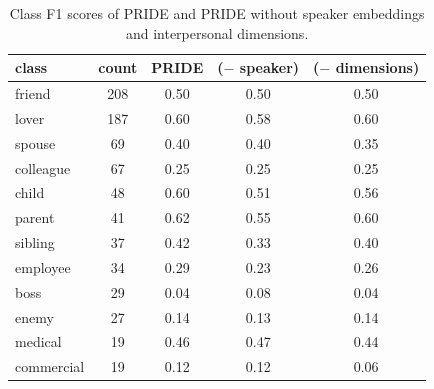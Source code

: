 \begin{table}[]
\centering
\begin{adjustbox}{width=0.63\textwidth}
\begin{tabular}{@{}l|c|ccc@{}}
\textbf{class}      & \textbf{count} & \textbf{PRIDE} & \textbf{($-$ speaker)} & \textbf{($-$ dimensions)} \\ \toprule
friend                          & 208                             & 0.50                            & 0.50                                      & 0.50                 \\
lover                           & 187                             & 0.60                            & 0.58                                      & 0.60                 \\
spouse                          & 69                              & 0.40                            & 0.40                                      & 0.35                 \\
colleague                       & 67                              & 0.25                            & 0.25                                      & 0.25                 \\
child                           & 48                              & 0.60                            & 0.51                                      & 0.56                 \\
parent                          & 41                              & 0.62                            & 0.55                                      & 0.60                 \\
sibling                         & 37                              & 0.42                            & 0.33                                      & 0.40                  \\
employee                        & 34                              & 0.29                            & 0.23                                      & 0.26                 \\
boss                            & 29                              & 0.04                            & 0.08                                      & 0.04                 \\
enemy                           & 27                              & 0.14                            & 0.13                                      & 0.14                 \\
medical                         & 19                              & 0.46                            & 0.47                                      & 0.44                 \\
commercial                      & 19                              & 0.12                            & 0.12                                      & 0.06            
\end{tabular}
\end{adjustbox}
\caption{Class F1 scores of PRIDE and PRIDE without speaker embeddings and interpersonal dimensions.}
\label{perclass}
\end{table}

